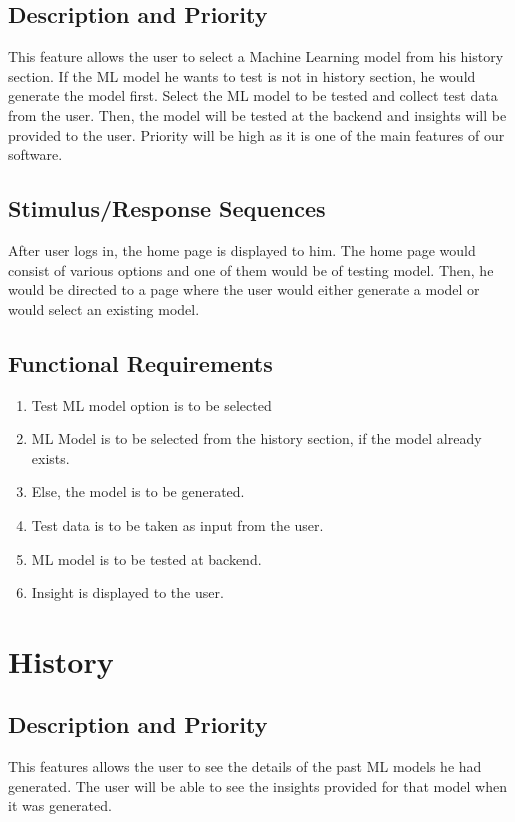 \documentclass{scrreprt}
\begin{document}
\subsection{Description and Priority}
This feature allows the user to select a Machine Learning model from his history section. If the ML model he wants to test is not in history section, he would generate the model first. Select the ML model to be tested and collect test data from the user. Then, the model will be tested at the backend and insights will be provided to the user. Priority will be high as it is one of the main features of our software.

\subsection{Stimulus/Response Sequences}
 After user logs in, the home page is displayed to him. The home page would consist of various options and one of them would be of testing model. Then, he would be directed to a page where the user would either generate a model or would select an existing model.

\subsection{Functional Requirements}
\begin{enumerate}
\item Test ML model option is to be selected
\item ML Model is to be selected from the history section, if the model already exists. 
\item Else, the model is to be generated.
\item Test data is to be taken as input from the user.
\item ML model is to be tested at backend.
\item Insight is displayed to the user.
\end{enumerate}

\section{History}

\subsection{Description and Priority}
This features allows the user to see the details of the past ML models he had generated. The user will be able to see the insights provided for that model when it was generated.
\end{document}
